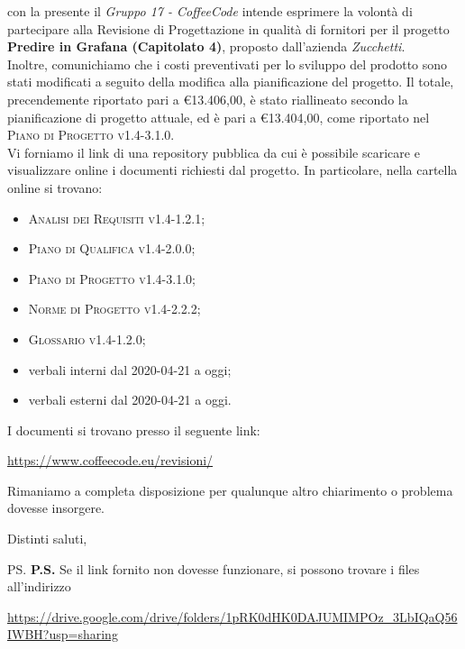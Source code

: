 \documentclass{letter}
\begin{document}
\begin{letter}{ }
con la presente il \textit{Gruppo 17 - CoffeeCode} intende esprimere la volontà di partecipare alla Revisione di Progettazione in qualità di fornitori per il progetto 
\textbf{Predire in Grafana (Capitolato 4)}, proposto dall'azienda \textit{Zucchetti}. \\
Inoltre, comunichiamo che i costi preventivati per lo sviluppo del prodotto sono stati modificati a seguito della modifica alla pianificazione del progetto.
Il totale, precendemente riportato pari a \euro 13.406,00, è stato riallineato secondo la pianificazione di progetto attuale, ed è pari a \euro 13.404,00, come riportato nel \textsc{Piano di Progetto v1.4-3.1.0}. \\
Vi forniamo il link di una repository pubblica da cui è possibile scaricare e visualizzare online i documenti richiesti dal progetto. In particolare, nella cartella online si trovano:
\begin{itemize}
  \item \textsc{Analisi dei Requisiti v1.4-1.2.1};
  \item \textsc{Piano di Qualifica v1.4-2.0.0};
  \item \textsc{Piano di Progetto v1.4-3.1.0};
  \item \textsc{Norme di Progetto v1.4-2.2.2};
  \item \textsc{Glossario v1.4-1.2.0};
  \item verbali interni dal 2020-04-21 a oggi;
  \item verbali esterni dal 2020-04-21 a oggi.
\end{itemize}
\newpage
I documenti si trovano presso il seguente link:
\begin{center}
  \centering
  \href{https://www.coffeecode.eu/revisioni/}{https://www.coffeecode.eu/revisioni/}
\end{center}


Rimaniamo a completa disposizione per qualunque altro chiarimento o problema dovesse insorgere.

\closing{Distinti saluti,}

\ps
\textbf{P.S.} Se il link fornito non dovesse funzionare, si possono trovare i files all'indirizzo
\begin{center}
	
	\href{https://drive.google.com/drive/folders/1pRK0dHK0DAJUMIMPOz_3LbIQaQ56IWBH?usp=sharing}{https://drive.google.com/drive/folders/1pRK0dHK0DAJUMIMPOz\_3LbIQaQ56IWBH?usp=sharing}
\end{center}

\end{letter}
\end{document}
